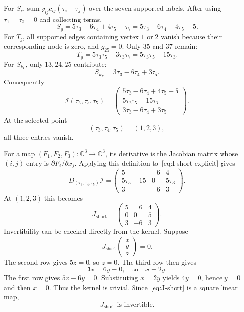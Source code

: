 \documentclass[11pt]{article}
\theoremstyle{definition}
\newcommand{\C}{\mathbb C}
\begin{document}
For $S_g$, sum $g_{ij}c_{ij}(\tau_i+\tau_j)$ over the seven supported labels.  After using $\tau_1=\tau_2=0$ and collecting terms,
\begin{equation}
S_g=5\tau_3-6\tau_4+4\tau_5-\tau_7
=5\tau_3-6\tau_4+4\tau_5-5.
\label{eq:Sg-short-explicit}
\end{equation}
For $T_g$, all supported edges containing vertex $1$ or $2$ vanish because their corresponding node is zero, and $g_{25}=0$.  Only $35$ and $37$ remain:
\begin{equation}
T_g=5\tau_3\tau_5-3\tau_3\tau_7
=5\tau_3\tau_5-15\tau_3.
\label{eq:Tg-short-explicit}
\end{equation}
For $S_{k_P}$, only $13,24,25$ contribute:
\begin{equation}
S_{k_P}=3\tau_3-6\tau_4+3\tau_5.
\label{eq:Sk-short-explicit}
\end{equation}
Consequently
\begin{equation}
\mathcal I(\tau_3,\tau_4,\tau_5)
=
\begin{pmatrix}
5\tau_3-6\tau_4+4\tau_5-5\\
5\tau_3\tau_5-15\tau_3\\
3\tau_3-6\tau_4+3\tau_5
\end{pmatrix}.
\label{eq:I-short-explicit}
\end{equation}
At the selected point
\[
(\tau_3,\tau_4,\tau_5)=(1,2,3),
\]
all three entries vanish.

For a map $(F_1,F_2,F_3):\C^3\to\C^3$, its derivative is the Jacobian matrix whose $(i,j)$ entry is $\partial F_i/\partial x_j$.  Applying this definition to~\eqref{eq:I-short-explicit} gives
\begin{equation}
D_{(\tau_3,\tau_4,\tau_5)}\mathcal I
=
\begin{pmatrix}
5&-6&4\\
5\tau_5-15&0&5\tau_3\\
3&-6&3
\end{pmatrix}.
\label{eq:J-short-general}
\end{equation}
At $(1,2,3)$ this becomes
\begin{equation}
J_{\mathrm{short}}
=
\begin{pmatrix}
5&-6&4\\
0&0&5\\
3&-6&3
\end{pmatrix}.
\label{eq:J-short}
\end{equation}
Invertibility can be checked directly from the kernel.  Suppose
\[
J_{\mathrm{short}}
\begin{pmatrix}x\\y\\z\end{pmatrix}=0.
\]
The second row gives $5z=0$, so $z=0$.  The third row then gives
\[
3x-6y=0,
\quad\text{so}\quad x=2y.
\]
The first row gives $5x-6y=0$.  Substituting $x=2y$ yields $4y=0$, hence $y=0$ and then $x=0$.  Thus the kernel is trivial.  Since~\eqref{eq:J-short} is a square linear map,
\begin{equation}
J_{\mathrm{short}}\text{ is invertible}.
\label{eq:J-short-invertible}
\end{equation}
\end{document}
